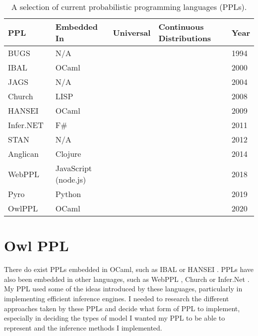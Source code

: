 \documentclass[sigconf]{acmart}
\newcommand{\cmark}{\textcolor{green1}{\checkmark}}%
\newcommand{\xmark}{\textcolor{red1}{\ding{55}}}%
\begin{document}
\begin{table}
  \centering
  \begin{tabular}{@{}lllp{3cm}l@{}}
    \toprule
    \textbf{PPL}
    & \textbf{Embedded In}
    & \textbf{Universal}
    & \textbf{Continuous Distributions}
    & \textbf{Year} \\
    \midrule

    BUGS~\cite{gilks1994bugs}
    & N/A & \xmark & \cmark & 1994 \\

    IBAL~\cite{ibal}
    & OCaml & \xmark & \xmark & 2000 \\

    JAGS~\cite{plummer2004jags}
    & N/A & \xmark & \cmark & 2004 \\

    Church~\cite{goodman2012church}
    & LISP & \cmark & \cmark & 2008 \\

    HANSEI~\cite{kiselyov2009embedded}
    & OCaml & \xmark & \xmark & 2009 \\

    Infer.NET~\cite{wang2011using}
    & F\# & \xmark & \cmark & 2011 \\

    STAN~\cite{carpenter2017stan}
    & N/A & \xmark & \cmark & 2012 \\

    Anglican~\cite{anglican-smc}
    & Clojure & \cmark & \cmark & 2014 \\

    WebPPL~\cite{mobus2018structure}
    & JavaScript (node.js) & \cmark & \cmark & 2018 \\

    Pyro~\cite{bingham2019pyro}
    & Python & \cmark & \cmark & 2019 \\

    OwlPPL
    & OCaml & \cmark & \cmark & 2020 \\
    \bottomrule
  \end{tabular}
  \caption{A selection of current probabilistic programming languages (PPLs).}
  \label{tab:ppl-summ}
\end{table}


\section{Owl PPL}

There do exist PPLs embedded in OCaml, such as IBAL \cite{ibal} or HANSEI \cite{kiselyov2009embedded}. PPLs have also been embedded in other languages, such as WebPPL \cite{mobus2018structure}, Church \cite{goodman2012church} or Infer.Net \cite{wang2011using}. My PPL used some of the ideas introduced by these languages, particularly in implementing efficient inference engines. I needed to research the different approaches taken by these PPLs and decide what form of PPL to implement, especially in deciding the types of model I wanted my PPL to be able to represent and the inference methods I implemented.
\end{document}
